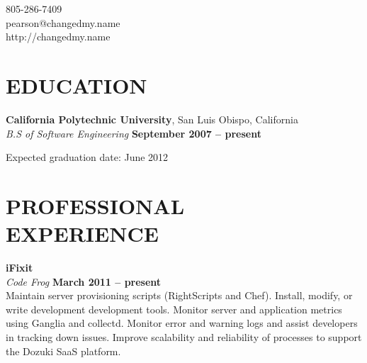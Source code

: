 \documentclass[margin,line]{resume}
\begin{document}
{
    \sc
    \hfill 805-286-7409                   \vspace{0mm}\\\vspace{0mm}%
    \hfill pearson@changedmy.name         \vspace{0mm}\\\vspace{0mm}%
    \hfill http://changedmy.name          \vspace{0mm}\\\vspace{-9mm}%
}

\begin{resume}

\vspace{6mm}

    \section{\mysidestyle \textbf{\large{E}\small{DUCATION}}}

    \textbf{\listing California Polytechnic University}, San Luis Obispo, California \vspace{2mm}\\\vspace{1mm}%
    \textsl{B.S of Software Engineering} \hfill \textbf{ September 2007 -- present}\vspace{-3mm}\\\vspace{-1mm}%
    \begin{list2}
        \item Expected graduation date: June 2012
    \end{list2}\vspace{-1.5mm}


\sectionline

    \section{\mysidestyle \textbf{\large{P}\small{ROFESSIONAL\\EXPERIENCE}}}

    \textbf{\listing iFixit} \vspace{2mm}\\\vspace{1mm}%
    \textsl{Code Frog} \hfill \textbf{March 2011 -- present}\\
    Maintain server provisioning scripts (RightScripts and Chef).
    Install, modify, or write development development tools.
    Monitor server and application metrics using Ganglia and collectd.
    Monitor error and warning logs and assist developers in tracking down issues.
    Improve scalability and reliability of processes to support the Dozuki SaaS platform.


\end{resume}
\end{document}

